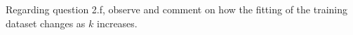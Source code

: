 \item {}

Regarding question 2.f, observe and comment on how the fitting of the training dataset changes as $k$ increases.